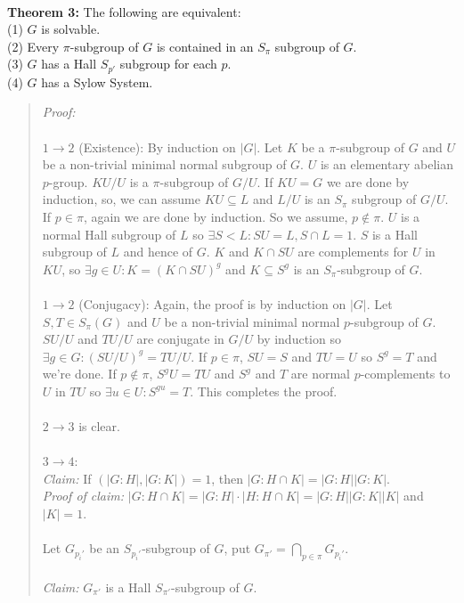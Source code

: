 \\
{\bf Theorem 3:}
The following are equivalent:\\
(1) $G$ is solvable.\\
(2) Every $\pi$-subgroup of $G$ is contained in an $S_{\pi}$ subgroup of $G$.\\
(3) $G$ has a Hall $S_{p'}$ subgroup for each $p$.\\
(4) $G$ has a Sylow System.
\begin{quote}
\emph{Proof:}  
\\
\\
$1 \rightarrow 2$ (Existence): 
By induction on $|G|$.  Let $K$ be a $\pi$-subgroup of $G$ and
$U$ be a non-trivial minimal normal subgroup of $G$.  $U$ is an elementary abelian
$p$-group.  $KU/U$ is a $\pi$-subgroup of $G/U$.  If $KU=G$ we are done by induction,
so, we can assume $KU \subseteq L$ and $L/U$ is an $S_{\pi}$ subgroup of $G/U$.
If $p \in \pi$, again we are done by induction.  So we assume, $p \notin \pi$.  $U$ is a
normal Hall subgroup of $L$ so $\exists S<L: SU=L, S \cap L = 1$.  $S$ is a Hall subgroup of
$L$ and hence of $G$.  $K$ and $K \cap SU$ are complements for $U$ in $KU$, so 
$\exists g \in U: K=(K \cap SU)^g$ and $K \subseteq S^g$ is an $S_{\pi}$-subgroup of $G$.
\\
\\
$1 \rightarrow 2$ (Conjugacy): 
Again, the proof is by induction on $|G|$.
Let $S, T \in S_{\pi}(G)$ and $U$ be a non-trivial minimal normal $p$-subgroup of $G$.
$SU/U$ and $TU/U$ are conjugate in $G/U$ by induction so $\exists g \in G: (SU/U)^g= TU/U$.
If $p \in \pi$, $SU=S$ and $TU=U$ so $S^g=T$ and we're done.
If $p \notin \pi$, $S^gU = TU$ and $S^g$ and $T$ are normal $p$-complements to $U$ in $TU$
so $\exists u \in U: S^{gu}= T$.  This completes the proof.
\\
\\
$2 \rightarrow 3$ is clear.
\\
\\
$3 \rightarrow 4$:\\
\emph{Claim:} If $(|G:H|,|G:K|)= 1$, then $|G: H \cap K|= |G:H| |G:K|$.
\\
\emph{Proof of claim:} 
$|G:H \cap K|= |G:H| \cdot |H: H \cap K| = |G:H| |G:K| |K|$ and $|K|=1$.
\\
\\
Let $G_{p_i'}$ be an $S_{p_i'}$-subgroup of $G$, put $G_{\pi'}= \bigcap_{p \in \pi} G_{p_i'}$.
\\
\\
\emph{Claim:} $G_{\pi'}$ is a Hall $S_{\pi'}$-subgroup of $G$.

\end{quote}
